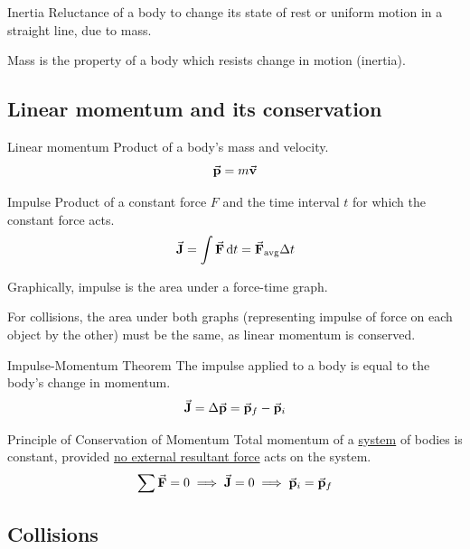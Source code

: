 \begin{defn}{Inertia}{}
Reluctance of a body to change its state of rest or uniform motion in a straight line, due to mass. 
\end{defn} 
\begin{remark}
Mass is the property of a body which resists change in motion (inertia).
\end{remark}
\pagebreak

\subsection{Linear momentum and its conservation}
\begin{defn}{Linear momentum}{}
Product of a body's mass and velocity. 
\begin{equation}
\va{p} = m\va{v}
\end{equation}
\end{defn} 

\begin{defn}{Impulse}{}
Product of a constant force $F$ and the time interval $t$ for which the constant force acts. 
\begin{equation} 
\va{J} = \int\va{F}\dd{t} = \va{F}_{\mathrm{avg}} \Delta t \end{equation}
\end{defn} 
Graphically, impulse is the area under a force-time graph. 

For collisions, the area under both graphs (representing impulse of force on each object by the other) must be the same, as linear momentum is conserved.

\begin{defn}{Impulse-Momentum Theorem}{}
The impulse applied to a body is equal to the body's change in momentum.
\begin{equation}
\va{J} = \Delta\va{p} = \va{p}_f-\va{p}_i
\end{equation}
\end{defn} 

\begin{defn}{Principle of Conservation of Momentum}{}
Total momentum of a \underline{system} of bodies is constant, provided \underline{no external resultant force} acts on the system.
\begin{equation}
\sum \va{F} = 0 \implies \va{J} = 0 \implies \va{p}_i=\va{p}_f
\end{equation}
\end{defn} 
\pagebreak

\subsection{Collisions}
